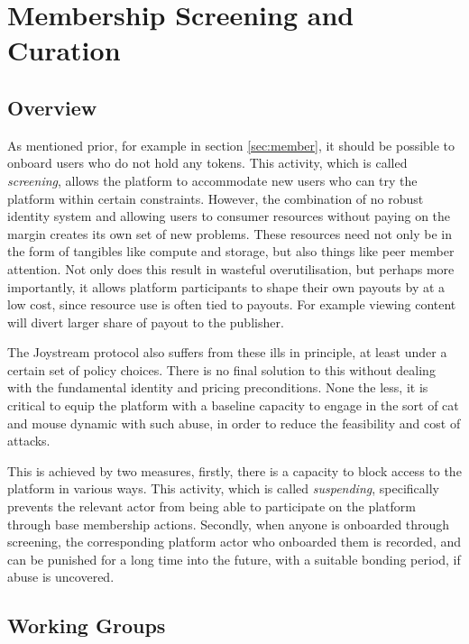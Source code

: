 \documentclass{article}
\begin{document}
\section{Membership Screening and Curation} \label{sec:membership_curation}

\subsection{Overview}

As mentioned prior, for example in section \ref{sec:member}, it should be possible to onboard users who do not hold any tokens. This activity, which is called \textit{screening}, allows the platform to accommodate new users who can try the platform within certain constraints. However, the combination of no robust identity system and allowing users to consumer resources without paying on the margin creates its own set of new problems. These resources need not only be in the form of tangibles like compute and storage, but also things like peer member attention. Not only does this result in wasteful overutilisation, but perhaps more importantly, it allows platform participants to shape their own payouts by at a low cost, since resource use is often tied to payouts. For example viewing content will divert larger share of payout to the publisher.

The Joystream protocol also suffers from these ills in principle, at least under a certain set of policy choices. There is no final solution to this without dealing with the fundamental identity and pricing preconditions. None the less, it is critical to equip the platform with a baseline capacity to engage in the sort of cat and mouse dynamic with such abuse, in order to reduce the feasibility and cost of attacks.

This is achieved by two measures, firstly, there is a capacity to block access to the platform in various ways. This activity, which is called \textit{suspending}, specifically prevents the relevant actor from being able to participate on the platform through base membership actions.
Secondly, when anyone is onboarded through screening, the corresponding platform actor who onboarded them is recorded, and can be punished for a long time into the future, with a suitable bonding period, if abuse is uncovered.

\subsection{Working Groups}
\end{document}

